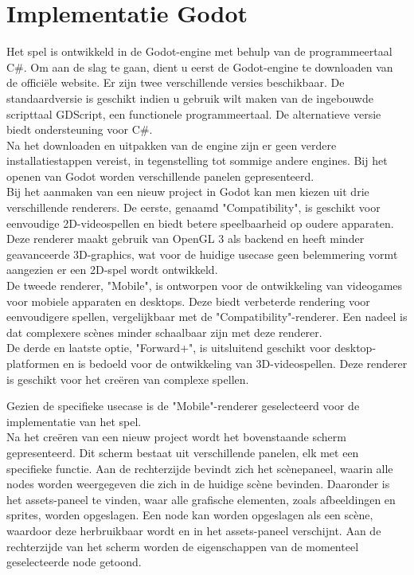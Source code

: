 \section{Implementatie Godot}
Het spel is ontwikkeld in de Godot-engine met behulp van de programmeertaal C\#. Om aan de slag te gaan, dient u eerst de Godot-engine te downloaden van de officiële website. Er zijn twee verschillende versies beschikbaar. De standaardversie is geschikt indien u gebruik wilt maken van de ingebouwde scripttaal GDScript, een functionele programmeertaal. De alternatieve versie biedt ondersteuning voor C\#.
\\
Na het downloaden en uitpakken van de engine zijn er geen verdere installatiestappen vereist, in tegenstelling tot sommige andere engines. Bij het openen van Godot worden verschillende panelen gepresenteerd.
\\
Bij het aanmaken van een nieuw project in Godot kan men kiezen uit drie verschillende renderers. De eerste, genaamd "Compatibility", is geschikt voor eenvoudige 2D-videospellen en biedt betere speelbaarheid op oudere apparaten. Deze renderer maakt gebruik van OpenGL 3 als backend en heeft minder geavanceerde 3D-graphics, wat voor de huidige usecase geen belemmering vormt aangezien er een 2D-spel wordt ontwikkeld.
\\
De tweede renderer, "Mobile", is ontworpen voor de ontwikkeling van videogames voor mobiele apparaten en desktops. Deze biedt verbeterde rendering voor eenvoudigere spellen, vergelijkbaar met de "Compatibility"-renderer. Een nadeel is dat complexere scènes minder schaalbaar zijn met deze renderer.
\\
De derde en laatste optie, "Forward+", is uitsluitend geschikt voor desktop-platformen en is bedoeld voor de ontwikkeling van 3D-videospellen. Deze renderer is geschikt voor het creëren van complexe spellen.

Gezien de specifieke usecase is de "Mobile"-renderer geselecteerd voor de implementatie van het spel.
\\
Na het creëren van een nieuw project wordt het bovenstaande scherm gepresenteerd. Dit scherm bestaat uit verschillende panelen, elk met een specifieke functie. Aan de rechterzijde bevindt zich het scènepaneel, waarin alle nodes worden weergegeven die zich in de huidige scène bevinden. Daaronder is het assets-paneel te vinden, waar alle grafische elementen, zoals afbeeldingen en sprites, worden opgeslagen. Een node kan worden opgeslagen als een scène, waardoor deze herbruikbaar wordt en in het assets-paneel verschijnt. Aan de rechterzijde van het scherm worden de eigenschappen van de momenteel geselecteerde node getoond.

